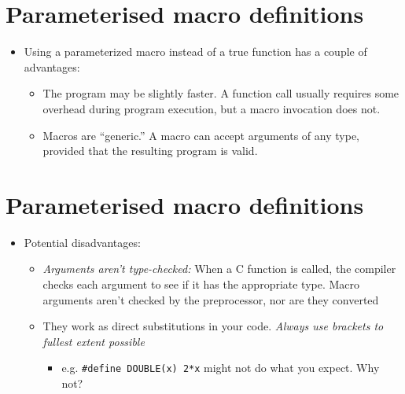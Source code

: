 \documentclass{article}
\begin{document}
\section{Parameterised macro definitions}
\begin{itemize}
\item Using a parameterized macro instead of a true function has a couple of advantages:

\begin{itemize}
\item The program may be slightly faster. A function call usually requires some overhead during program execution, but a macro invocation does not.
\item Macros are ``generic.'' A macro can accept arguments of any type, provided that the resulting program is valid.
\end{itemize}
\end{itemize}



\section{Parameterised macro definitions}
\begin{itemize}
\item Potential disadvantages:
\begin{itemize}
\item \emph{Arguments aren't type-checked:}
When a C function is called, the compiler checks each argument to see if it has the appropriate type. Macro arguments aren't checked by the preprocessor, nor are they converted
\item They work as direct substitutions in your code. \emph{Always use brackets to fullest extent possible}
\begin{itemize}
\item e.g. \verb!#define DOUBLE(x) 2*x!  might not do what you expect. Why not?
\end{itemize}
\end{itemize}
\end{itemize}
\end{document}
